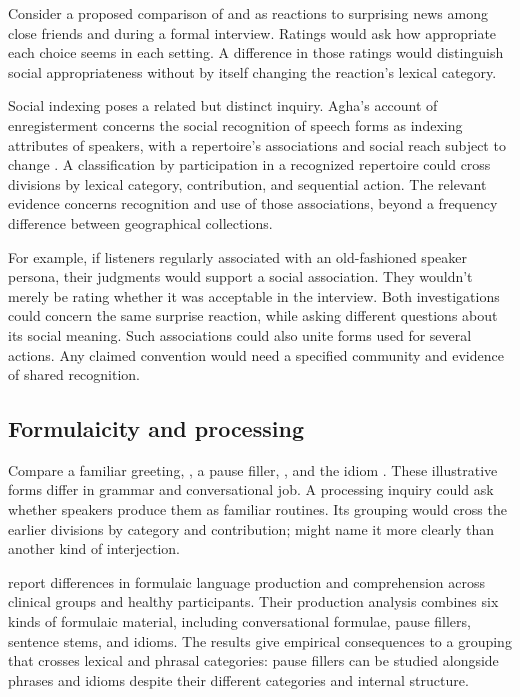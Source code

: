 \documentclass[12pt]{article}
\begin{document}
Consider a proposed comparison of  and 
as reactions to surprising news among close friends and during a
formal interview. Ratings would ask how appropriate each choice seems
in each setting. A difference in those ratings would distinguish
social appropriateness without by itself changing the reaction's
lexical category.

Social indexing poses a related but distinct inquiry. Agha's account
of enregisterment concerns the social recognition of speech forms as
indexing attributes of speakers, with a repertoire's associations and
social reach subject to change \citep[38--40]{agha2005}. A classification
by participation in a recognized repertoire could cross divisions by
lexical category, contribution, and sequential action. The relevant evidence concerns
recognition and use of those associations, beyond a frequency difference
between geographical collections.

For example, if listeners regularly associated  with an
old-fashioned speaker persona, their judgments would support a social
association. They wouldn't merely be rating whether it was acceptable
in the interview. Both investigations could concern the same surprise
reaction, while asking different questions about its social meaning.
Such associations could also unite forms used for several actions.
Any claimed convention would need a specified community and evidence
of shared recognition.

\subsection{Formulaicity and processing}

Compare a familiar greeting, , a pause filler,
, and the idiom . These illustrative
forms differ in grammar and conversational job. A processing inquiry
could ask whether speakers produce them as familiar routines.
Its grouping would cross the earlier divisions by category and contribution;
 might name it more clearly than another
kind of interjection.

\textcite{vanlanckersidtis2015} report differences in formulaic
language production and comprehension across clinical groups and
healthy participants. Their production
analysis combines six kinds of formulaic material, including conversational
formulae, pause fillers, sentence stems, and idioms. The results give
empirical consequences to a grouping that crosses lexical and phrasal
categories: pause fillers can be studied alongside phrases and idioms
despite their different categories and internal structure.
\end{document}
